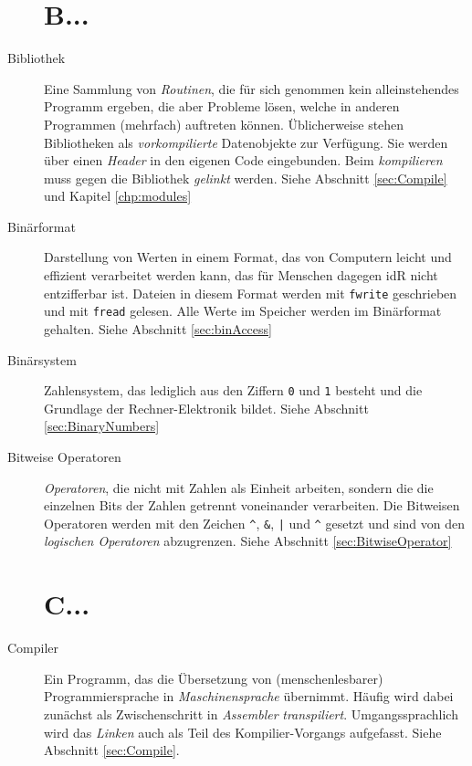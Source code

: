 \begin{appendices}
\begin{description}
\section*{B...}
\item[Bibliothek] Eine Sammlung von \emph{Routinen}, die für sich genommen kein alleinstehendes Programm
	ergeben, die aber Probleme lösen, welche in anderen Programmen (mehrfach) auftreten können.
	Üblicherweise stehen Bibliotheken als \emph{vorkompilierte} Datenobjekte zur Verfügung. Sie werden
	über einen \emph{Header} in den eigenen Code eingebunden. Beim \emph{kompilieren} muss gegen die
	Bibliothek \emph{gelinkt} werden.\newline
	Siehe Abschnitt \ref{sec:Compile} und Kapitel \ref{chp:modules}
\item[Binärformat] Darstellung von Werten in einem Format, das von Computern leicht und effizient
	verarbeitet werden kann, das für Menschen dagegen idR nicht entzifferbar ist. Dateien in diesem
	Format werden mit \texttt{fwrite} geschrieben und mit \texttt{fread} gelesen. Alle Werte im Speicher
	werden im Binärformat gehalten.\newline
	Siehe Abschnitt \ref{sec:binAccess}
\item[Binärsystem] Zahlensystem, das lediglich aus den Ziffern \texttt{0} und \texttt{1} besteht und die
	Grundlage der Rechner-Elektronik bildet. \newline
	Siehe Abschnitt \ref{sec:BinaryNumbers}
\item[Bitweise Operatoren] \emph{Operatoren}, die nicht mit Zahlen als Einheit arbeiten, sondern die die
	einzelnen Bits der Zahlen getrennt voneinander verarbeiten. Die Bitweisen Operatoren werden
	mit den Zeichen \texttt{\textasciicircum}, \texttt{\&}, \texttt{|} und \texttt{\^} gesetzt und sind
	von den \emph{logischen Operatoren} abzugrenzen.\newline
	Siehe Abschnitt \ref{sec:BitwiseOperator}

\section*{C...}
\item[Compiler] Ein Programm, das die Übersetzung von (menschenlesbarer) Programmiersprache in
	\emph{Maschinensprache} übernimmt. Häufig wird dabei zunächst als Zwischenschritt in
	\emph{Assembler} \emph{transpiliert}.\newline
	Umgangssprachlich wird das \emph{Linken} auch als Teil des Kompilier-Vorgangs aufgefasst.\newline
	Siehe Abschnitt \ref{sec:Compile}.
	

\end{description}
\end{appendices}
